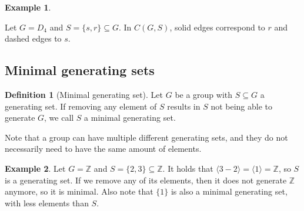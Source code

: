 \documentclass[a4paper,10pt]{article}
\numberwithin{equation}{section}
\theoremstyle{definition}
\newtheorem{definition}[theorem]{Definition}
\newtheorem*{example}{Example}
\begin{document}
    \begin{example}
        \leavevmode\par
        \begin{center}
        \end{center}
        Let \(G=D_4\) and \(S =\{s, r
        \}\subseteq G\). In \(C(G, S)\), solid edges correspond to \(r\) and dashed edges to \(s\).
    \end{example}
\subsection{Minimal generating sets}
    \begin{definition}[Minimal generating set]
        Let \(G\) be a group with \(S\subseteq G\) a generating set. If removing any element of \(S\) results in \(S\) not being able to generate \(G\), we call \(S\) a minimal generating set.
    \end{definition}
    Note that a group can have multiple different generating sets, and they do not necessarily need to have the same amount of elements.
    \begin{example}
        Let \(G = \mathbb{Z}\) and \(S=\{2, 3\}\subseteq \mathbb{Z}\). It holds that \(\langle 3-2\rangle = \langle 1\rangle = \mathbb{Z}\), so \(S\) is a generating set. If we remove any of its elements, then it does not generate \(\mathbb{Z}\) anymore, so it is minimal. Also note that \(\{1\}\) is also a minimal generating set, with less elements than \(S\).
    \end{example}
\end{document}
